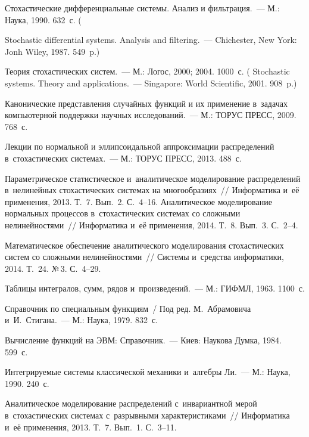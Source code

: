 \begin{multicols}{2}
{{\begin{thebibliography}{99}
 \vspace*{-2pt}

Стохастические дифференциальные системы. Анализ и фильтрация.~---
М.: Наука,  1990.  632~с. (\linebreak\vspace*{-12pt}
\pagebreak

\noindent
Stochastic differential systems.
Analysis and filtering.~--- Chichester, New York: Jonh Wiley, 1987.
549~p.)

Теория стохастических систем.~--- М.: Логос, 2000; 2004. 1000~с.
(
Stochastic systems. Theory and  applications.~---
Singapore: World Scientific, 2001. 908~p.)

Канонические представления случайных функций и их применение в~задачах
компьютерной поддержки научных исследований.~--- М.: ТОРУС
ПРЕСС, 2009. 768~с.


Лекции по нормальной и эллипсоидальной аппроксимации распределений
в~стохастических системах.~--- М.: ТОРУС ПРЕСС, 2013. 488~с.

Параметрическое статистическое и~аналитическое моделирование распределений
в~нелинейных стохастических системах на многообразиях~//
Информатика и~её применения, 2013. Т.~7. Вып.~2. С.~4--16.
Аналитическое моделирование нормальных процессов в~стохастических системах
со сложными нелинейностями~// Информатика и~её применения, 2014. Т.~8.
Вып.~3. С.~2--4.

Математическое обеспечение аналитического моделирования стохастических систем
со сложными нелинейностями~// Системы и~средства информатики, 2014.
Т.~24. №\,3. С.~4--29.



Таблицы интегралов, сумм, рядов и~произведений.~--- М.: ГИФМЛ, 1963. 1100~с.

Справочник по специальным функциям~/ Под ред. М.~Абрамовича и~И.~Стигана.~---
М.: Наука, 1979. 832~с.

Вычисление функций на ЭВМ: Справочник.~--- Киев: Наукова Думка, 1984. 599~с.

Интегрируемые системы классической механики и~ал\-геб\-ры Ли.~---
М.: Наука, 1990. 240~с.

Аналитическое моделирование распределений с~инвариантной мерой
в~стохастических системах с~разрывными характеристиками~// Информатика
и~её применения, 2013. Т.~7. Вып.~1. С.~3--11.
 \end{thebibliography}

 }
 }

\end{multicols}

